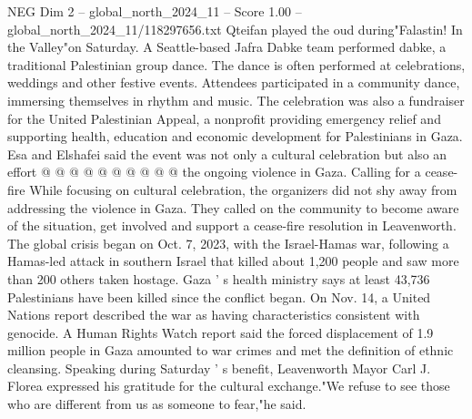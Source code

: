 \begin{textsample}{NEG Dim 2 – global\_north\_2024\_11 – Score 1.00 – global\_north\_2024\_11/118297656.txt}
Qteifan played the oud during"Falastin!
In the Valley"on Saturday.
A Seattle-based Jafra Dabke team performed dabke, a traditional Palestinian group dance.
The dance is often performed at celebrations, weddings and other festive events.
Attendees participated in a community dance, immersing themselves in rhythm and music.
The celebration was also a fundraiser for the United Palestinian Appeal, a nonprofit providing emergency relief and supporting health, education and economic development for Palestinians in Gaza.
Esa and Elshafei said the event was not only a cultural celebration but also an effort @ @ @ @ @ @ @ @ @ @ the ongoing violence in Gaza.
Calling for a cease-fire While focusing on cultural celebration, the organizers did not shy away from addressing the violence in Gaza.
They called on the community to become aware of the situation, get involved and support a cease-fire resolution in Leavenworth.
The global crisis began on Oct. 7, 2023, with the Israel-Hamas war, following a Hamas-led attack in southern Israel that killed about 1,200 people and saw more than 200 others taken hostage.
Gaza ' s health ministry says at least 43,736 Palestinians have been killed since the conflict began.
On Nov. 14, a United Nations report described the war as having characteristics consistent with genocide.
A Human Rights Watch report said the forced displacement of 1.9 million people in Gaza amounted to war crimes and met the definition of ethnic cleansing.
Speaking during Saturday ' s benefit, Leavenworth Mayor Carl J.
Florea expressed his gratitude for the cultural exchange."We refuse to see those who are different from us as someone to fear,"he said.

\end{textsample}
